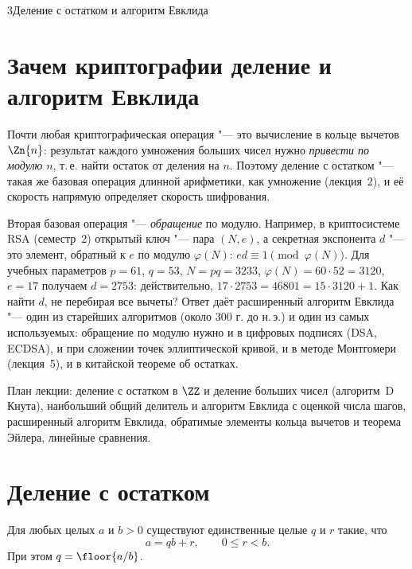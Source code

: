 \begin{lecture}{3}{Деление с остатком и алгоритм Евклида}

\section{Зачем криптографии деление и алгоритм Евклида}

Почти любая криптографическая операция "--- это вычисление в кольце вычетов $\Zn{n}$: результат
каждого умножения больших чисел нужно \emph{привести по модулю} $n$, т.\,е. найти остаток от
деления на $n$. Поэтому деление с остатком "--- такая же базовая операция длинной арифметики, как
умножение (лекция~2), и её скорость напрямую определяет скорость шифрования.

Вторая базовая операция "--- \emph{обращение} по модулю. Например, в криптосистеме RSA
(семестр~2) открытый ключ "--- пара $(N, e)$, а секретная экспонента $d$ "--- это элемент, обратный
к $e$ по модулю $\varphi(N)$: $ed \equiv 1 \pmod{\varphi(N)}$. Для учебных параметров $p = 61$,
$q = 53$, $N = pq = 3233$, $\varphi(N) = 60 \cdot 52 = 3120$, $e = 17$ получаем $d = 2753$:
действительно, $17 \cdot 2753 = 46801 = 15 \cdot 3120 + 1$. Как найти $d$, не перебирая все
вычеты? Ответ даёт расширенный алгоритм Евклида "--- один из старейших алгоритмов (около 300 г.
до н.\,э.) и один из самых используемых: обращение по модулю нужно и в цифровых подписях
(DSA, ECDSA), и при сложении точек эллиптической кривой, и в методе
Монтгомери (лекция~5), и в китайской теореме об остатках.

План лекции: деление с остатком в $\ZZ$ и деление больших чисел (алгоритм~D Кнута), наибольший
общий делитель и алгоритм Евклида с оценкой числа шагов, расширенный алгоритм Евклида, обратимые
элементы кольца вычетов и теорема Эйлера, линейные сравнения.

\section{Деление с остатком}

\begin{theorem}\label{l3:divrem}
Для любых целых $a$ и $b > 0$ существуют единственные целые $q$ и $r$ такие, что
\[
  a = qb + r, \qquad 0 \le r < b.
\]
При этом $q = \floor{a/b}$.
\end{theorem}


\end{lecture}
